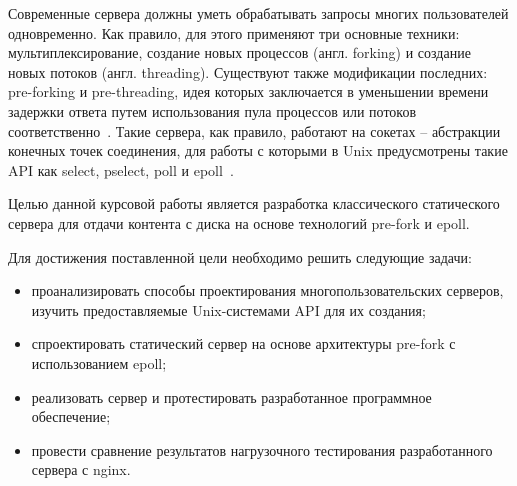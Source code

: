 
Современные сервера должны уметь обрабатывать запросы многих пользователей одновременно. Как правило, для этого применяют три основные техники: мультиплексирование, создание новых процессов (англ. forking) и создание новых потоков (англ. threading). Существуют также модификации последних: pre-forking и pre-threading, идея которых заключается в уменьшении времени задержки ответа путем использования пула процессов или потоков соответственно~\cite{Tiwari2012ASP}. Такие сервера, как правило, работают на сокетах -- абстракции конечных точек соединения, для работы с которыми в Unix предусмотрены такие API как select, pselect, poll и epoll~\cite{gammo-linux-simposium-2004}.

Целью данной курсовой работы является разработка классического статического сервера для отдачи контента с диска на основе технологий pre-fork и epoll.

Для достижения поставленной цели необходимо решить следующие задачи:

\begin{itemize}[label=---]
	
	\item проанализировать способы проектирования многопользовательских серверов, изучить предоставляемые Unix-системами API для их создания;
	
	\item спроектировать статический сервер на основе архитектуры pre-fork с использованием epoll;
	
	\item реализовать сервер и протестировать разработанное программное обеспечение;
	
	\item провести сравнение результатов нагрузочного тестирования разработанного сервера с nginx.
	
\end{itemize}

\pagebreak

